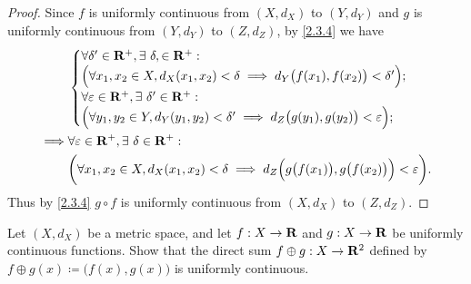 \begin{proof}
  Since \(f\) is uniformly continuous from \((X, d_X)\) to \((Y, d_Y)\) and \(g\) is uniformly continuous from \((Y, d_Y)\) to \((Z, d_Z)\), by \cref{2.3.4} we have
  \begin{align*}
             & \begin{cases}
                 \forall \delta' \in \mathbf{R}^+, \exists\ \delta, \in \mathbf{R}^+ :                                                    \\
                 \Big(\forall x_1, x_2 \in X, d_X(x_1, x_2) < \delta \implies d_Y\big(f(x_1), f(x_2)\big) < \delta'\Big); \\
                 \forall \varepsilon \in \mathbf{R}^+, \exists\ \delta' \in \mathbf{R}^+ :                                                \\
                 \Big(\forall y_1, y_2 \in Y, d_Y(y_1, y_2) < \delta' \implies d_Z\big(g(y_1), g(y_2)\big) < \varepsilon\Big);
               \end{cases}                         \\
    \implies & \forall \varepsilon \in \mathbf{R}^+, \exists\ \delta \in \mathbf{R}^+ :                                                                             \\
             & \bigg(\forall x_1, x_2 \in X, d_X(x_1, x_2) < \delta \implies d_Z\Big(g\big(f(x_1)\big), g\big(f(x_2)\big)\Big) < \varepsilon\bigg).
  \end{align*}
  Thus by \cref{2.3.4} \(g \circ f\) is uniformly continuous from \((X, d_X)\) to \((Z, d_Z)\).
\end{proof}

\begin{exercise}\label{ex 2.3.5}
  Let \((X, d_X)\) be a metric space, and let \(f : X \to \mathbf{R}\) and \(g : X \to \mathbf{R}\) be uniformly continuous functions.
  Show that the direct sum \(f \oplus g : X \to \mathbf{R}^2\) defined by \(f \oplus g(x) \coloneqq \big(f(x), g(x)\big)\) is uniformly continuous.
\end{exercise}

